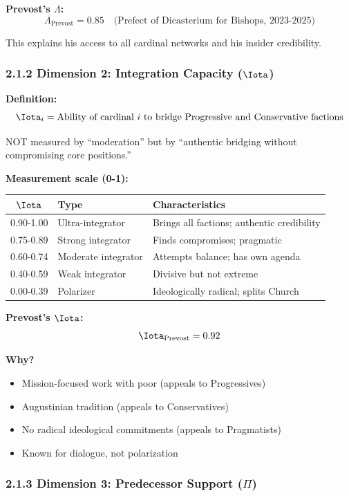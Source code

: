 \documentclass[11pt]{article}
\begin{document}
\textbf{Prevost's $\Lambda$:}
$$\Lambda_{\text{Prevost}} = 0.85 \quad \text{(Prefect of Dicasterium for Bishops, 2023-2025)}$$

This explains his access to all cardinal networks and his insider credibility.

\subsubsection{2.1.2 Dimension 2: Integration Capacity ($\Iota$)}

\textbf{Definition:}
$$\Iota_i = \text{Ability of cardinal } i \text{ to bridge Progressive and Conservative factions}$$

NOT measured by ``moderation'' but by ``authentic bridging without compromising core positions.''

\textbf{Measurement scale (0-1):}

\begin{table}[h]
\centering
\begin{tabular}{|c|l|l|}
\hline
$\Iota$ & \textbf{Type} & \textbf{Characteristics} \\
\hline
0.90-1.00 & Ultra-integrator & Brings all factions; authentic credibility \\
0.75-0.89 & Strong integrator & Finds compromises; pragmatic \\
0.60-0.74 & Moderate integrator & Attempts balance; has own agenda \\
0.40-0.59 & Weak integrator & Divisive but not extreme \\
0.00-0.39 & Polarizer & Ideologically radical; splits Church \\
\hline
\end{tabular}
\end{table}

\textbf{Prevost's $\Iota$:}
$$\Iota_{\text{Prevost}} = 0.92$$

\textbf{Why?}
\begin{itemize}
\item Mission-focused work with poor (appeals to Progressives)
\item Augustinian tradition (appeals to Conservatives)
\item No radical ideological commitments (appeals to Pragmatists)
\item Known for dialogue, not polarization
\end{itemize}

\subsubsection{2.1.3 Dimension 3: Predecessor Support ($\Pi$)}
\end{document}

